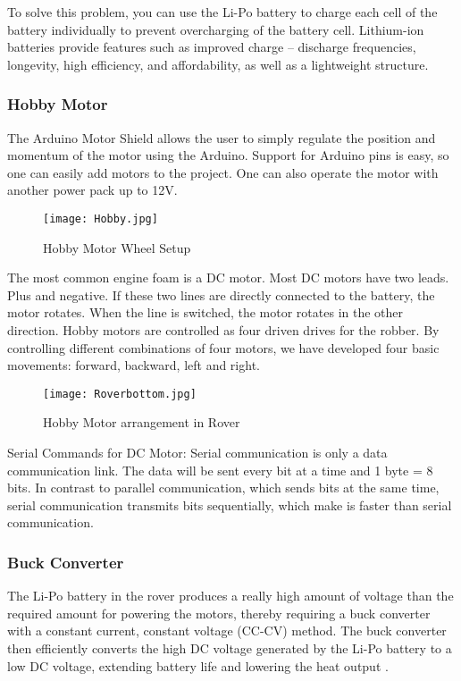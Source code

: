 \documentclass[conference,a4paper]{IEEEtran}
\begin{document}
To solve this problem, you can use the Li-Po battery to charge each cell of the battery individually to prevent overcharging of the battery cell. Lithium-ion batteries provide features such as improved charge – discharge frequencies, longevity, high efficiency, and affordability, as well as a lightweight structure. \cite{19}

\subsubsection{Hobby Motor}
The Arduino Motor Shield allows the user to simply regulate the position and momentum of the motor using the Arduino. Support for Arduino pins is easy, so one can easily add motors to the project. One can also operate the motor with another power pack up to 12V.

\begin{figure}[ht]
\centering
\texttt{[image: Hobby.jpg]}
\caption{Hobby Motor Wheel Setup}
\label{Fig: Hobby}
\end{figure}

The most common engine foam is a DC motor. Most DC motors have  two leads. Plus and negative. If these two lines are directly connected to the battery, the motor rotates. When the line is switched, the motor rotates in the other direction.  
Hobby motors are controlled as four driven drives for the robber. By controlling different combinations of  four motors, we have developed four basic movements: forward, backward, left and right.

\begin{figure}[ht]
\centering
\texttt{[image: Roverbottom.jpg]}
\caption{Hobby Motor arrangement in Rover}
\label{Fig: Hobby Arrangement}
\end{figure}

Serial Commands for DC Motor: Serial communication is only a data communication link. The data will be sent every bit at a time and 1 byte = 8 bits. In contrast to parallel communication, which sends bits at the same time, serial communication transmits bits sequentially, which make is faster than serial communication.

\subsubsection{Buck Converter}
The Li-Po battery in the rover produces a really high amount of voltage than the required amount for powering the motors, thereby requiring a buck converter with a constant current, constant voltage (CC-CV) method. The buck converter then efficiently converts the high DC voltage generated by the Li-Po battery to a low DC voltage, extending battery life and lowering the heat output
\cite{18}.
\end{document}
